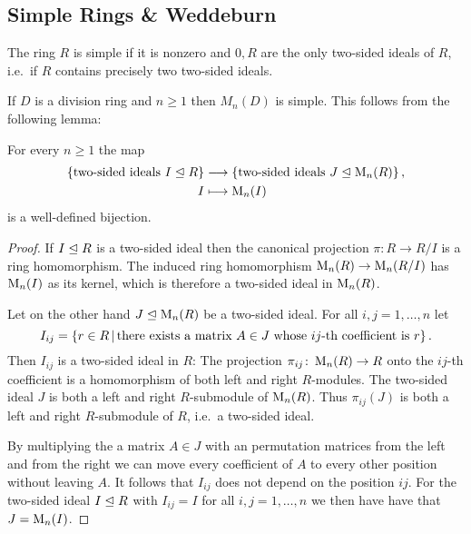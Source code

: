 \subsection{Simple Rings \& Weddeburn}


\begin{definition}
  The ring $R$ is simple if it is nonzero and $0, R$ are the only two-sided ideals of $R$, i.e.\ if $R$ contains precisely two two-sided ideals.
\end{definition}


\begin{example}
  \label{example: simple ring}
  If $D$ is a division ring and $n \geq 1$ then $M_n(D)$ is simple.
  This follows from the following lemma:
\end{example}


\begin{lemma}
  For every $n \geq 1$ the map
  \begin{align*}
              \{ \text{two-sided ideals $I \trianglelefteq R$} \}
    &\longrightarrow  \{ \text{two-sided ideals $J \trianglelefteq \operatorname{M}_n(R)$} \} \,,
    \\
                  I
    &\longmapsto  \operatorname{M}_n(I)
  \end{align*}
  is a well-defined bijection.
\end{lemma}


\begin{proof}
  If $I \trianglelefteq R$ is a two-sided ideal then the canonical projection $\pi \colon R \to R/I$ is a ring homomorphism.
  The induced ring homomorphism $\operatorname{M}_n(R) \to \operatorname{M}_n(R/I)$ has $\operatorname{M}_n(I)$ as its kernel, which is therefore a two-sided ideal in $\operatorname{M}_n(R)$.
  
  Let on the other hand $J \trianglelefteq \operatorname{M}_n(R)$ be a two-sided ideal.
  For all $i, j = 1, \dotsc, n$ let
  \[
      I_{ij}
    = \{
        r \in R
      \suchthat
        \text{there exists a matrix $A \in J$ whose $ij$-th coefficient is $r$}
      \} \,.
  \]
  Then $I_{ij}$ is a two-sided ideal in $R$:
  The projection $\pi_{ij} \colon \operatorname{M}_n(R) \to R$ onto the $ij$-th coefficient is a homomorphism of both left and right $R$-modules.
  The two-sided ideal $J$ is both a left and right $R$-submodule of $\operatorname{M}_n(R)$.
  Thus $\pi_{ij}(J)$ is both a left and right $R$-submodule of $R$, i.e.\ a two-sided ideal.
  
  By multiplying the a matrix $A \in J$ with an permutation matrices from the left and from the right we can move every coefficient of $A$ to every other position without leaving $A$.
  It follows that $I_{ij}$ does not depend on the position $ij$.
  For the two-sided ideal $I \trianglelefteq R$ with $I_{ij} = I$ for all $i, j = 1, \dotsc, n$ we then have have that $J = \operatorname{M}_n(I)$.
\end{proof}



